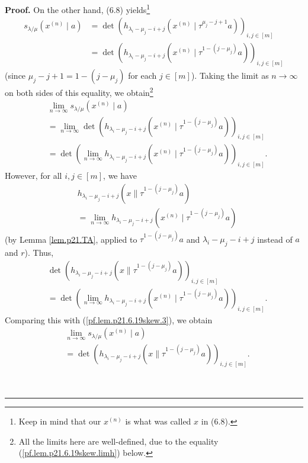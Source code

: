 \documentclass[numbers=enddot,12pt,final,onecolumn,notitlepage]{scrartcl}%
\theoremstyle{definition}
\newenvironment{proof}[1][Proof]{\noindent\textbf{#1.} }{\ \rule{0.5em}{0.5em}}
\newenvironment{noncompile}{}{}
\begin{document}
\begin{enumerate}
\begin{noncompile}
\begin{proof}
On the other hand, (6.8) yields\footnote{Keep in mind that our $x^{\left(
n\right)  }$ is what was called $x$ in (6.8).}%
\begin{align*}
s_{\lambda/\mu}\left(  x^{\left(  n\right)  }\mid a\right)   &  =\det\left(
h_{\lambda_{i}-\mu_{j}-i+j}\left(  x^{\left(  n\right)  }\mid\tau^{\mu
_{j}-j+1}a\right)  \right)  _{i,j\in\left[  m\right]  }\\
&  =\det\left(  h_{\lambda_{i}-\mu_{j}-i+j}\left(  x^{\left(  n\right)  }%
\mid\tau^{1-\left(  j-\mu_{j}\right)  }a\right)  \right)  _{i,j\in\left[
m\right]  }%
\end{align*}
(since $\mu_{j}-j+1=1-\left(  j-\mu_{j}\right)  $ for each $j\in\left[
m\right]  $). Taking the limit as $n\rightarrow\infty$ on both sides of this
equality, we obtain\footnote{All the limits here are well-defined, due to the
equality (\ref{pf.lem.p21.6.19skew.limh}) below.}%
\begin{align}
&  \lim\limits_{n\rightarrow\infty}s_{\lambda/\mu}\left(  x^{\left(  n\right)
}\mid a\right) \nonumber\\
&  =\lim\limits_{n\rightarrow\infty}\det\left(  h_{\lambda_{i}-\mu_{j}%
-i+j}\left(  x^{\left(  n\right)  }\mid\tau^{1-\left(  j-\mu_{j}\right)
}a\right)  \right)  _{i,j\in\left[  m\right]  }\nonumber\\
&  =\det\left(  \lim\limits_{n\rightarrow\infty}h_{\lambda_{i}-\mu_{j}%
-i+j}\left(  x^{\left(  n\right)  }\mid\tau^{1-\left(  j-\mu_{j}\right)
}a\right)  \right)  _{i,j\in\left[  m\right]  }. \label{pf.lem.p21.6.19skew.3}%
\end{align}
However, for all $i,j\in\left[  m\right]  $, we have%
\begin{align}
&  h_{\lambda_{i}-\mu_{j}-i+j}\left(  x\parallel\tau^{1-\left(  j-\mu
_{j}\right)  }a\right) \nonumber\\
&  =\lim\limits_{n\rightarrow\infty}h_{\lambda_{i}-\mu_{j}-i+j}\left(
x^{\left(  n\right)  }\mid\tau^{1-\left(  j-\mu_{j}\right)  }a\right)
\label{pf.lem.p21.6.19skew.limh}%
\end{align}
(by Lemma \ref{lem.p21.TA}, applied to $\tau^{1-\left(  j-\mu_{j}\right)  }a$
and $\lambda_{i}-\mu_{j}-i+j$ instead of $a$ and $r$). Thus,
\begin{align*}
&  \det\left(  h_{\lambda_{i}-\mu_{j}-i+j}\left(  x\parallel\tau^{1-\left(
j-\mu_{j}\right)  }a\right)  \right)  _{i,j\in\left[  m\right]  }\\
&  =\det\left(  \lim\limits_{n\rightarrow\infty}h_{\lambda_{i}-\mu_{j}%
-i+j}\left(  x^{\left(  n\right)  }\mid\tau^{1-\left(  j-\mu_{j}\right)
}a\right)  \right)  _{i,j\in\left[  m\right]  }.
\end{align*}
Comparing this with (\ref{pf.lem.p21.6.19skew.3}), we obtain%
\begin{align}
&  \lim\limits_{n\rightarrow\infty}s_{\lambda/\mu}\left(  x^{\left(  n\right)
}\mid a\right) \nonumber\\
&  =\det\left(  h_{\lambda_{i}-\mu_{j}-i+j}\left(  x\parallel\tau^{1-\left(
j-\mu_{j}\right)  }a\right)  \right)  _{i,j\in\left[  m\right]  }.
\label{pf.lem.p21.6.19skew.5}%
\end{align}



\end{proof}
\end{noncompile}
\end{enumerate}
\end{document}

